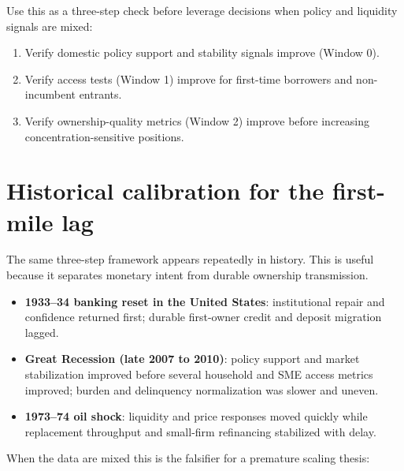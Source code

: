 \documentclass[11pt,openany]{book}
\begin{document}
Use this as a three-step check before leverage decisions when policy and liquidity signals are mixed:

\begin{enumerate}
  \item Verify domestic policy support and stability signals improve (Window 0).
  \item Verify access tests (Window 1) improve for first-time borrowers and non-incumbent entrants.
  \item Verify ownership-quality metrics (Window 2) improve before increasing concentration-sensitive positions.
\end{enumerate}

\section{Historical calibration for the first-mile lag}

The same three-step framework appears repeatedly in history. This is useful because it separates monetary intent from durable ownership transmission.

\begin{itemize}
  \item \textbf{1933--34 banking reset in the United States}: institutional repair and confidence returned first; durable first-owner credit and deposit migration lagged.
  \item \textbf{Great Recession (late 2007 to 2010)}: policy support and market stabilization improved before several household and SME access metrics improved; burden and delinquency normalization was slower and uneven.
  \item \textbf{1973--74 oil shock}: liquidity and price responses moved quickly while replacement throughput and small-firm refinancing stabilized with delay.
\end{itemize}

When the data are mixed this is the falsifier for a premature scaling thesis:
\end{document}
